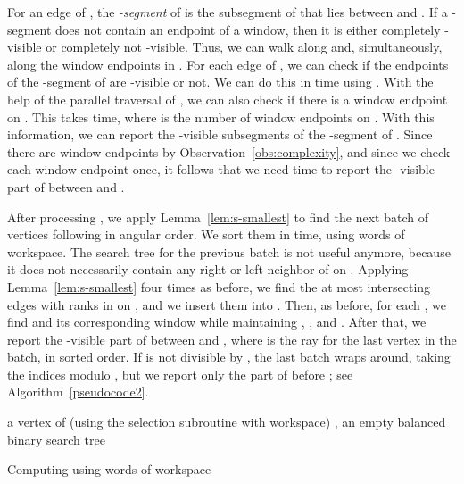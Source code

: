 \documentclass[11pt, a4paper]{article}
\newenvironment{alg}{
  \begin{algorithm}[htbp]
    \DontPrintSemicolon
    \SetKwInput{KwIn}{input}
    \SetKwInput{KwOut}{output}
  }{\end{algorithm}}
\begin{document}
For an edge  of , the 
\emph{-segment} of  is the subsegment of  that lies between
 and . If a -segment does not contain an endpoint 
of a window, then it is either completely -visible or completely 
not -visible. 
Thus, we can walk along  and, simultaneously, along the 
window endpoints in . For each edge  of , we 
can check if the endpoints of the -segment of  are -visible
or not. We can do this in  time using . With the help 
of the parallel traversal of , we can also check 
if there is a window endpoint on . This takes  
time, where  is the number of window endpoints on . With 
this information, we can report the -visible subsegments of 
the -segment of . Since there are  window 
endpoints by Observation~\ref{obs:complexity},
and since we check each window endpoint once,
it follows that we need  time
to report the -visible part of  between  and 
.

After processing , we apply 
Lemma~\ref{lem:s-smallest} to find the next batch of  
vertices following  in angular order. We sort them in 
 time, using  words of workspace. The search tree 
 for the previous
batch is not useful anymore, because it does not necessarily contain 
any right or left neighbor of  on . Applying 
Lemma~\ref{lem:s-smallest} four times as before, we find the at most 
 intersecting edges with ranks in 
on , and we insert them into . 
Then, as before, for each , we find  and 
its corresponding window while maintaining , , and . 
After that, we report the -visible part of  between
 and , where  is the ray for the last vertex 
in the batch, in sorted order. If  is not divisible by ,
the last batch wraps around, taking the indices modulo , 
but we report only the part of  before ; 
see Algorithm~\ref{pseudocode2}. 

\begin{alg}
  a vertex of \;
  (using the selection subroutine with  workspace)\;
 ,  an empty balanced binary search tree\;
 \;
 
 \caption{Computing  using  words of workspace}\label{pseudocode2}
\end{alg}
\end{document}
